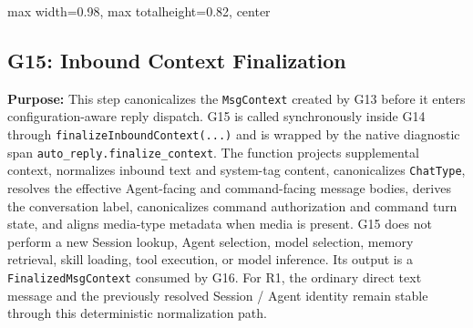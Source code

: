 \begin{center}
\begin{adjustbox}{
max width=0.98\textwidth,
max totalheight=0.82\textheight,
center
}

\end{adjustbox}

\end{center}


\subsection*{G15: Inbound Context Finalization}

\textbf{Purpose:}
This step canonicalizes the \texttt{MsgContext} created by G13 before
it enters configuration-aware reply dispatch. G15 is called
synchronously inside G14 through
\texttt{finalizeInboundContext(...)} and is wrapped by the native
diagnostic span \texttt{auto\_reply.finalize\_context}. The function
projects supplemental context, normalizes inbound text and system-tag
content, canonicalizes \texttt{ChatType}, resolves the effective
Agent-facing and command-facing message bodies, derives the
conversation label, canonicalizes command authorization and command
turn state, and aligns media-type metadata when media is present.
G15 does not perform a new Session lookup, Agent selection, model
selection, memory retrieval, skill loading, tool execution, or model
inference. Its output is a \texttt{FinalizedMsgContext} consumed by
G16. For R1, the ordinary direct text message and the previously
resolved Session / Agent identity remain stable through this
deterministic normalization path.


